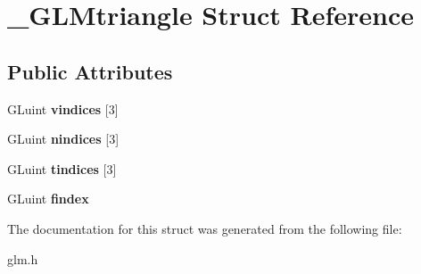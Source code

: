 \hypertarget{struct__GLMtriangle}{\section{\-\_\-\-G\-L\-Mtriangle \-Struct \-Reference}
\label{struct__GLMtriangle}
}
\subsection*{\-Public \-Attributes}
\begin{DoxyCompactItemize}
\item 
\hypertarget{struct__GLMtriangle_a261d6913421550571727e596ba883738}{\-G\-Luint {\bfseries vindices} \mbox{[}3\mbox{]}}\label{struct__GLMtriangle_a261d6913421550571727e596ba883738}

\item 
\hypertarget{struct__GLMtriangle_a435600028fff20ba36c044a187b78649}{\-G\-Luint {\bfseries nindices} \mbox{[}3\mbox{]}}\label{struct__GLMtriangle_a435600028fff20ba36c044a187b78649}

\item 
\hypertarget{struct__GLMtriangle_a659836cad97a9458493f90117dc8edaa}{\-G\-Luint {\bfseries tindices} \mbox{[}3\mbox{]}}\label{struct__GLMtriangle_a659836cad97a9458493f90117dc8edaa}

\item 
\hypertarget{struct__GLMtriangle_a5b153daf9e5ffee033dbd919c1a8c02a}{\-G\-Luint {\bfseries findex}}\label{struct__GLMtriangle_a5b153daf9e5ffee033dbd919c1a8c02a}

\end{DoxyCompactItemize}


\-The documentation for this struct was generated from the following file\-:\begin{DoxyCompactItemize}
\item 
glm.\-h\end{DoxyCompactItemize}
